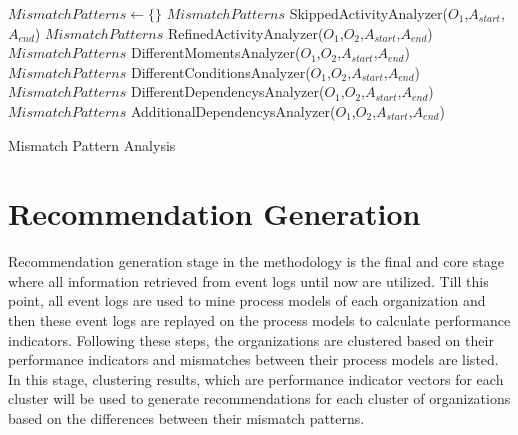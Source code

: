 \begin{algorithm}
\DontPrintSemicolon %
$MismatchPatterns \leftarrow \{\}$ \;
$MismatchPatterns$ \leftarrow  SkippedActivityAnalyzer($O_{1}$,$A_{start}$,$A_{end}$) \;
$MismatchPatterns$ \leftarrow  RefinedActivityAnalyzer($O_{1}$,$O_{2}$,$A_{start}$,$A_{end}$) \;
$MismatchPatterns$ \leftarrow  DifferentMomentsAnalyzer($O_{1}$,$O_{2}$,$A_{start}$,$A_{end}$) \;
$MismatchPatterns$ \leftarrow  DifferentConditionsAnalyzer($O_{1}$,$O_{2}$,$A_{start}$,$A_{end}$) \;
$MismatchPatterns$ \leftarrow  DifferentDependencysAnalyzer($O_{1}$,$O_{2}$,$A_{start}$,$A_{end}$) \;
$MismatchPatterns$ \leftarrow  AdditionalDependencysAnalyzer($O_{1}$,$O_{2}$,$A_{start}$,$A_{end}$) \;
\;
\caption{Mismatch Pattern Analysis}
\label{algo:mismatch}
\end{algorithm}

\section{Recommendation Generation}
\label{sec:recommendation-generation}
Recommendation generation stage in the methodology is the final and core stage where all information retrieved from event logs until now are utilized. Till this point, all event logs are used to mine process models of each organization and then these event logs are replayed on the process models to calculate performance indicators. Following these steps, the organizations are clustered based on their performance indicators and mismatches between their process models are listed. In this stage, clustering results, which are performance indicator vectors for each cluster will be used to generate recommendations for each cluster of organizations based on the differences between their mismatch patterns.

